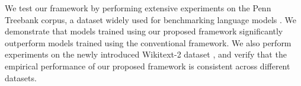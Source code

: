 We test our framework by performing extensive experiments on the Penn Treebank corpus, a dataset widely used for benchmarking language models \citep{mikolov2010recurrent,merity2016pointer}.
We demonstrate that models trained using our proposed framework significantly outperform models trained using the conventional framework.
We also perform experiments on the newly introduced Wikitext-2 dataset \citep{merity2016pointer}, and verify that the empirical performance of our proposed framework is consistent across different datasets.


